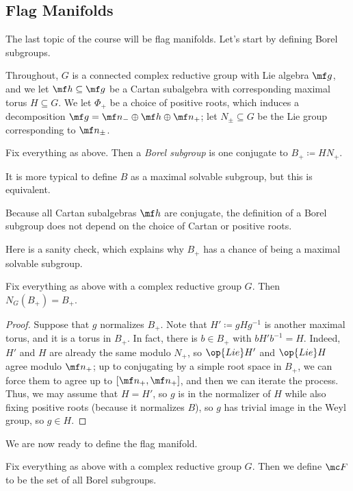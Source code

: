 \documentclass[../notes.tex]{subfiles}
\begin{document}
\subsection{Flag Manifolds}
The last topic of the course will be flag manifolds. Let's start by defining Borel subgroups.
\begin{notation}
	Throughout, $G$ is a connected complex reductive group with Lie algebra $\mf g$, and we let $\mf h\subseteq\mf g$ be a Cartan subalgebra with corresponding maximal torus $H\subseteq G$. We let $\Phi_+$ be a choice of positive roots, which induces a decomposition $\mf g=\mf n_-\oplus\mf h\oplus\mf n_+$; let $N_\pm\subseteq G$ be the Lie group corresponding to $\mf n_\pm$.
\end{notation}
\begin{definition}
	Fix everything as above. Then a \textit{Borel subgroup} is one conjugate to $B_+\coloneqq HN_+$.
\end{definition}
\begin{remark}
	It is more typical to define $B$ as a maximal solvable subgroup, but this is equivalent.
\end{remark}
\begin{remark}
	Because all Cartan subalgebras $\mf h$ are conjugate, the definition of a Borel subgroup does not depend on the choice of Cartan or positive roots.
\end{remark}
Here is a sanity check, which explains why $B_+$ has a chance of being a maximal solvable subgroup.
\begin{lemma} \label{lem:borel-is-own-normalizer}
	Fix everything as above with a complex reductive group $G$. Then $N_G(B_+)=B_+$.
\end{lemma}
\begin{proof}
	Suppose that $g$ normalizes $B_+$. Note that $H'\coloneqq gHg^{-1}$ is another maximal torus, and it is a torus in $B_+$. In fact, there is $b\in B_+$ with $bH'b^{-1}=H$. Indeed, $H'$ and $H$ are already the same modulo $N_+$, so $\op{Lie}H'$ and $\op{Lie}H$ agree modulo $\mf n_+$; up to conjugating by a simple root space in $B_+$, we can force them to agree up to $[\mf n_+,\mf n_+]$, and then we can iterate the process. Thus, we may assume that $H=H'$, so $g$ is in the normalizer of $H$ while also fixing positive roots (because it normalizes $B$), so $g$ has trivial image in the Weyl group, so $g\in H$.
\end{proof}
We are now ready to define the flag manifold.
\begin{definition}
	Fix everything as above with a complex reductive group $G$. Then we define $\mc F$ to be the set of all Borel subgroups.
\end{definition}
\end{document}
